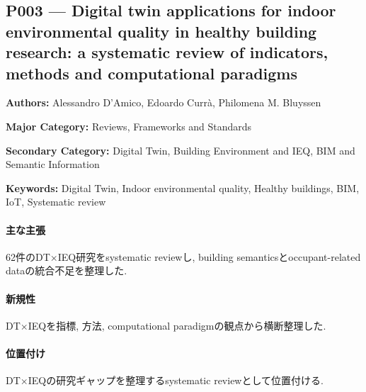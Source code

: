 \subsection{P003 --- Digital twin applications for indoor environmental quality in healthy building research: a systematic review of indicators, methods and computational paradigms}
\label{paper:P003}
\textbf{Authors:} Alessandro D'Amico, Edoardo Currà, Philomena M. Bluyssen\par
\textbf{Major Category:} Reviews, Frameworks and Standards\par
\textbf{Secondary Category:} Digital Twin, Building Environment and IEQ, BIM and Semantic Information\par
\textbf{Keywords:} Digital Twin, Indoor environmental quality, Healthy buildings, BIM, IoT, Systematic review\par
\paragraph{主な主張}
62件のDT×IEQ研究をsystematic reviewし, building semanticsとoccupant-related dataの統合不足を整理した. \cite{DAmico:2026DTIEQ}
\paragraph{新規性}
DT×IEQを指標, 方法, computational paradigmの観点から横断整理した.
\paragraph{位置付け}
DT×IEQの研究ギャップを整理するsystematic reviewとして位置付ける.
